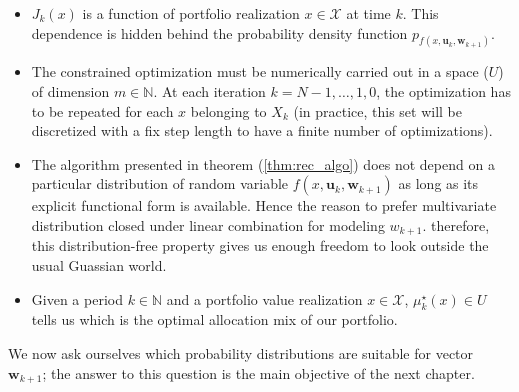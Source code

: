 \begin{itemize}
	\item $J_k(x)$ is a function of portfolio realization $x \in \mathcal{X}$ at time $k$. This dependence is hidden behind the probability density function $p_{f(x,\bm{u}_k,\bm{w}_{k+1})}$.
	\item The constrained optimization must be numerically carried out in a space ($U$) of dimension $m \in \mathbb{N}$. At each iteration $k = N-1,\ldots,1,0$, the optimization has to be repeated for each $x$ belonging to $X_k$ (in practice, this set will be discretized with a fix step length to have a finite number of optimizations).
	\item The algorithm presented in theorem (\ref{thm:rec_algo}) does not depend on a particular distribution of random variable $f(x,\bm{u}_k,\bm{w}_{k+1})$ as long as its explicit functional form is available. Hence the reason to prefer multivariate distribution closed under linear combination for modeling $w_{k+1}$. therefore, this distribution-free property gives us enough freedom to look outside the usual Guassian world.
	\item Given a period $k \in \mathbb{N}$ and a portfolio value realization $x \in \mathcal{X}$, $\mu_k^{\star}(x) \in U$ tells us which is the optimal allocation mix of our portfolio.
\end{itemize}

We now ask ourselves which probability distributions are suitable for vector $\bm{w}_{k+1}$; the answer to this question is the main objective of the next chapter.
